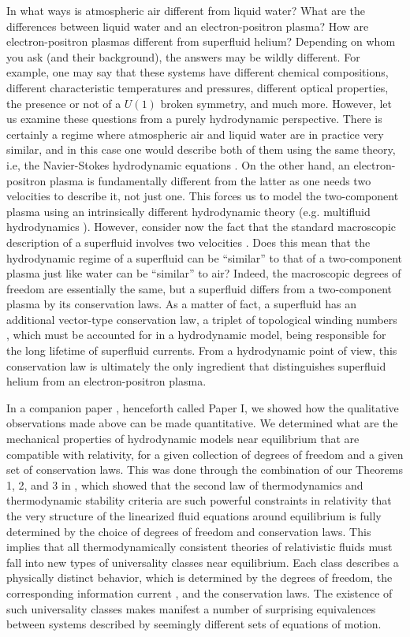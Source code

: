 \documentclass[a4paper, amsfonts, amssymb, amsmath, reprint, showkeys, nofootinbib, twoside, onecolumn,notitlepage]{revtex4-1}
\begin{document}
In what ways is atmospheric air different from liquid water? What are the differences between liquid water and an electron-positron plasma?
How are electron-positron plasmas different from superfluid helium? Depending on whom you ask (and their background), the answers may be wildly different. For example, one may say that these systems have different chemical compositions, different characteristic temperatures and pressures, different optical properties, the presence or not of a $U(1)$ broken symmetry, and much more. However, let us examine these questions from a purely hydrodynamic perspective. There is certainly a regime where atmospheric air and liquid water are in practice very similar, and in this case one would describe both of them using the same theory, i.e, the Navier-Stokes hydrodynamic equations \cite{landau10}. On the other hand, an electron-positron plasma is fundamentally different from the latter as one needs two velocities to describe it, not just one. This forces us to model the two-component plasma using an intrinsically different hydrodynamic theory (e.g. multifluid hydrodynamics \cite{prix2004}). However, consider now the fact that the standard macroscopic description of a superfluid involves two velocities \cite{landau9}. Does this mean that the hydrodynamic regime of a superfluid can be ``similar'' to that of a two-component plasma just like water can be ``similar'' to air? Indeed, the macroscopic degrees of freedom are essentially the same, but a superfluid differs from a two-component plasma by its conservation laws. As a matter of fact, a superfluid has an additional vector-type conservation law, a triplet of topological winding numbers \cite{AndreevMelnikovsky2004,Termo}, which must be accounted for in a hydrodynamic model, being responsible for the long lifetime of superfluid currents. From a hydrodynamic point of view, this conservation law is ultimately the only ingredient that distinguishes superfluid helium from an electron-positron plasma.

In a companion paper \cite{paperI}, henceforth called Paper I, we showed how the qualitative observations made above can be made quantitative. We determined what are the mechanical properties of hydrodynamic models near equilibrium that are compatible with relativity, for a given collection of degrees of freedom and a given set of conservation laws. This was done through the combination of our Theorems 1, 2, and 3 in \cite{paperI}, which showed that the second law of thermodynamics and thermodynamic stability criteria are such powerful constraints in relativity that the very structure of the linearized fluid equations around equilibrium is fully determined by the choice of degrees of freedom and conservation laws. This implies that all thermodynamically consistent theories of relativistic fluids must fall into new types of universality classes near equilibrium. Each class describes a physically distinct behavior, which is determined by the degrees of freedom, the corresponding information current \cite{GavassinoGibbs2021,GavassinoCausality2021}, and the conservation laws. The existence of such universality classes makes manifest a number of surprising equivalences between systems described by seemingly different sets of equations of motion. 
\end{document}
